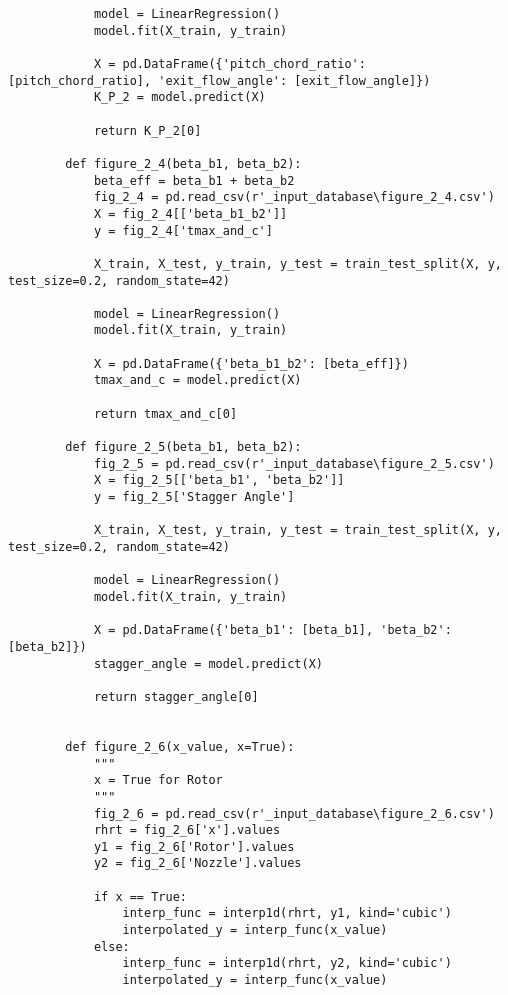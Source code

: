 \begin{verbatim}
            model = LinearRegression()
            model.fit(X_train, y_train)

            X = pd.DataFrame({'pitch_chord_ratio': [pitch_chord_ratio], 'exit_flow_angle': [exit_flow_angle]})
            K_P_2 = model.predict(X)
            
            return K_P_2[0]
         
        def figure_2_4(beta_b1, beta_b2):
            beta_eff = beta_b1 + beta_b2
            fig_2_4 = pd.read_csv(r'_input_database\figure_2_4.csv')
            X = fig_2_4[['beta_b1_b2']]
            y = fig_2_4['tmax_and_c']

            X_train, X_test, y_train, y_test = train_test_split(X, y, test_size=0.2, random_state=42)

            model = LinearRegression()
            model.fit(X_train, y_train)

            X = pd.DataFrame({'beta_b1_b2': [beta_eff]})
            tmax_and_c = model.predict(X)
            
            return tmax_and_c[0]
        
        def figure_2_5(beta_b1, beta_b2):
            fig_2_5 = pd.read_csv(r'_input_database\figure_2_5.csv')
            X = fig_2_5[['beta_b1', 'beta_b2']]
            y = fig_2_5['Stagger Angle']

            X_train, X_test, y_train, y_test = train_test_split(X, y, test_size=0.2, random_state=42)

            model = LinearRegression()
            model.fit(X_train, y_train)

            X = pd.DataFrame({'beta_b1': [beta_b1], 'beta_b2': [beta_b2]})
            stagger_angle = model.predict(X)
            
            return stagger_angle[0]
        
        
        def figure_2_6(x_value, x=True):
            """
            x = True for Rotor
            """
            fig_2_6 = pd.read_csv(r'_input_database\figure_2_6.csv')
            rhrt = fig_2_6['x'].values
            y1 = fig_2_6['Rotor'].values
            y2 = fig_2_6['Nozzle'].values

            if x == True:
                interp_func = interp1d(rhrt, y1, kind='cubic')
                interpolated_y = interp_func(x_value)
            else:
                interp_func = interp1d(rhrt, y2, kind='cubic')
                interpolated_y = interp_func(x_value)
            

\end{verbatim}
